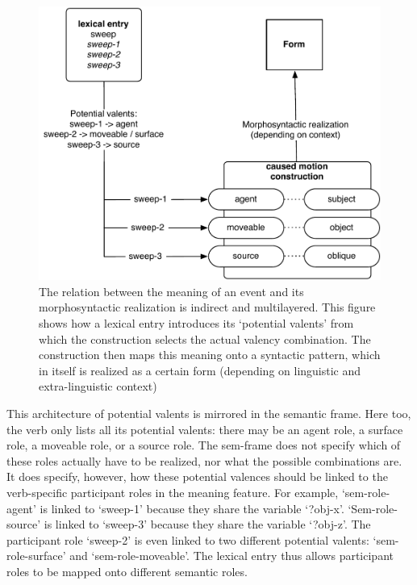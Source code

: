 \begin{figure}[t]
\centerline{\includegraphics[width=0.8\linewidth]{Chapter2/figs/quadrant}}
 \caption[Integrating {\em sweep} with the Caused-Motion Construction]{The relation between the meaning of an event and its morphosyntactic realization is indirect and multilayered. This figure shows how a lexical entry introduces its `potential valents' from which the construction selects the actual valency combination. The construction then maps this meaning onto a syntactic pattern, which in itself is realized as a certain form (depending on linguistic and extra-linguistic context)}
   \label{f:sweep-quadrant}
\end{figure}

This architecture of potential valents is mirrored in the semantic frame. Here too, the verb only lists all its potential valents: there may be an agent role, a surface role, a moveable role, or a source role. The sem-frame does not specify which of these roles actually have to be realized, nor what the possible combinations are. It does specify, however, how these potential valences should be linked to the verb-specific participant roles in the meaning feature. For example, `sem-role-agent' is linked to `sweep-1' because they share the variable `?obj-x'. `Sem-role-source' is linked to `sweep-3' because they share the variable `?obj-z'. The participant role `sweep-2' is even linked to two different potential valents: `sem-role-surface' and `sem-role-moveable'. The lexical entry thus allows participant roles to be mapped onto different semantic roles.

